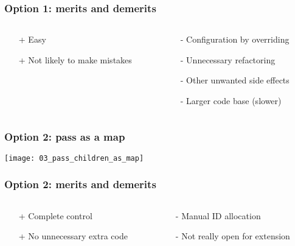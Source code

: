 \begin{frame}
    \frametitle{Option 1: merits and demerits}
    \begin{columns}

        \begin{column}{0.5\textwidth}
            \begin{itemize}
                \item[+] Easy
                \item[+] Not likely to make mistakes
            \end{itemize}
        \end{column}

        \begin{column}{0.5\textwidth}
            \begin{itemize}
                \item[-] Configuration by overriding
                \item[-] Unnecessary refactoring
                \item[-] Other unwanted side effects
                \item[-] Larger code base (slower) 
            \end{itemize}
        \end{column}
    \end{columns}
\end{frame}

\begin{frame}
    \frametitle{Option 2: pass as a map}
    \texttt{[image: 03\_pass\_children\_as\_map]}
\end{frame}

\begin{frame}
    \frametitle{Option 2: merits and demerits}
    \begin{columns}

        \begin{column}{0.5\textwidth}
            \begin{itemize}
                \item[+] Complete control
                \item[+] No unnecessary extra code
            \end{itemize}
        \end{column}

        \begin{column}{0.5\textwidth}
            \begin{itemize}
                \item[-] Manual ID allocation 
                \item[-] Not really open for extension
            \end{itemize}
        \end{column}
    \end{columns}
\end{frame}

